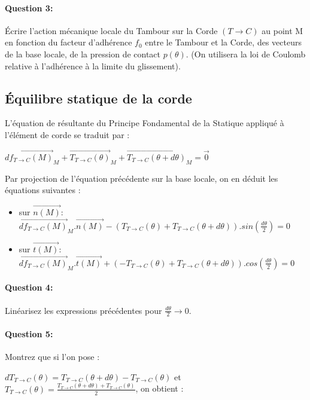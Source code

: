 \paragraph{Question 3:} Écrire l'action mécanique locale du Tambour sur la Corde $(T \rightarrow C)$ au point M en fonction du facteur d'adhérence $f_0$ entre le Tambour et la Corde, des vecteurs de la base locale, de la pression de contact $p(\theta)$. (On utilisera la loi de Coulomb relative à l'adhérence à la limite du glissement).

\subsection{Équilibre statique de la corde}

L'équation de résultante du Principe Fondamental de la Statique appliqué à l'élément de corde se traduit par :  

$\overrightarrow{df_{T \rightarrow C}(M)}_M+\overrightarrow{T_{T \rightarrow C}(\theta)}_M+\overrightarrow{T_{T \rightarrow C}(\theta+d \theta)}_M=\overrightarrow{0}$ 

Par projection de l'équation précédente sur la base locale, on en déduit les équations suivantes :
\begin{itemize}
 \item sur $\overrightarrow{n(M)}$: $\overrightarrow{df_{T \rightarrow C}(M)}_M.\overrightarrow{n(M)}-(T_{T \rightarrow C}(\theta)+T_{T \rightarrow C}(\theta+d \theta)).sin\left(\frac{d \theta}{2}\right)=0$ 
 \item sur $\overrightarrow{t(M)}$: $\overrightarrow{df_{T \rightarrow C}(M)}_M.\overrightarrow{t(M)}+(-T_{T \rightarrow C}(\theta)+T_{T \rightarrow C}(\theta+d \theta)).cos\left(\frac{d \theta}{2}\right)=0$ 
\end{itemize}

\paragraph{Question 4:} Linéarisez les expressions précédentes pour $\frac{d \theta}{2} \rightarrow 0$.

\paragraph{Question 5:} Montrez que si l'on pose :

$dT_{T \rightarrow C}(\theta)=T_{T \rightarrow C}(\theta+d \theta)-T_{T \rightarrow C}(\theta)$ et $T_{T \rightarrow C}(\theta)=\frac{T_{T \rightarrow C}(\theta+d \theta)+T_{T \rightarrow C}(\theta)}{2}$, on obtient :

